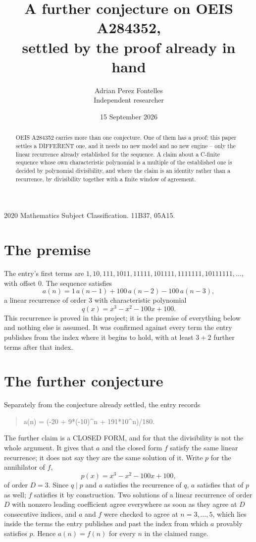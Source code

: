 \documentclass[11pt,a4paper]{article}
\title{A further conjecture on OEIS A284352,\\ \large settled by the proof already in hand}
\author{Adrian Perez Fontelles\\ \small Independent researcher}
\date{15 September 2026}
\theoremstyle{plain}
\theoremstyle{definition}
\begin{document}
\maketitle

\begin{abstract}
OEIS A284352 carries more than one conjecture. One of them has a proof; this paper settles a
DIFFERENT one, and it needs no new model and no new engine -- only the linear recurrence already
established for the sequence. A claim about a C-finite sequence whose own characteristic
polynomial is a multiple of the established one is decided by polynomial divisibility, and where
the claim is an identity rather than a recurrence, by divisibility together with a finite window
of agreement.
\end{abstract}

\noindent\small 2020 Mathematics Subject Classification. 11B37, 05A15.\normalsize

\section{The premise}

The entry's first terms are $1, 10, 111, 1011, 11111, 101111, 1111111, 10111111,\dots$, with offset $0$. The sequence satisfies
\[
  a(n)=1\,a(n-1) + 100\,a(n-2) - 100\,a(n-3) ,
\]
a linear recurrence of order $3$ with characteristic polynomial
\[
  q(x)=x^{3} - x^{2} - 100 x + 100 .
\]
This recurrence is proved in this project; it is the premise of everything below and nothing else is assumed.
It was confirmed against every term the entry publishes from the index where it begins to hold,
with at least $3+2$ further terms after that index.

\section{The further conjecture}

Separately from the conjecture already settled, the entry records

\begin{quote}\raggedright a(n) = (-20 + 9*(-10)\^{}n + 191*10\^{}n)/180.\end{quote}

The further claim is a CLOSED FORM, and for that the divisibility is not the whole argument. It
gives that $a$ and the closed form $f$ satisfy the same linear recurrence; it does not say they
are the same solution of it. Write $p$ for the annihilator of $f$,
\[
  p(x)=x^{3} - x^{2} - 100 x + 100 ,
\]
of order $D=3$. Since $q\mid p$ and $a$ satisfies the recurrence of $q$, $a$ satisfies that of
$p$ as well; $f$ satisfies it by construction. Two solutions of a linear recurrence of order $D$
with nonzero leading coefficient agree everywhere as soon as they agree at $D$ consecutive
indices, and $a$ and $f$ were checked to agree at $n=3,\dots,5$,
which lies inside the terms the entry publishes and past the index from which $a$ provably
satisfies $p$. Hence $a(n)=f(n)$ for every $n$ in the claimed range.
\end{document}
